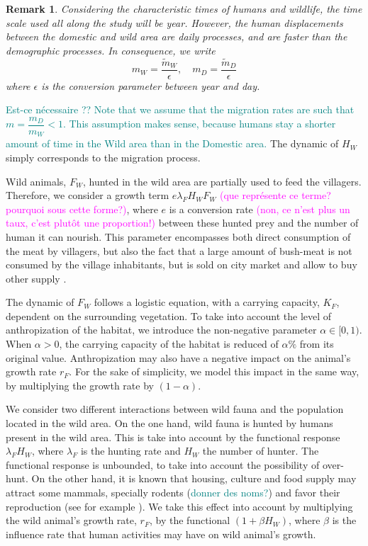 \documentclass{article}
\newcommand{\lfw}{\lambda_{F}}
\newcommand{\lfw}{\lambda_{F}}
\newcommand{\mW}{\tilde{m}_W}
\newcommand{\mD}{\tilde{m}_D}
\newcommand{\marc}[1]{\textcolor{teal}{#1}}
\newcommand{\YD}[1]{\textcolor{magenta}{#1}}
\newtheorem{remark}{Remark}
\begin{document}
\begin{remark} \label{remark:slow-fast}
Considering the characteristic times of humans and wildlife, the time scale used all along the study will be year. However, the human displacements between the domestic and wild area are daily processes, and are faster than the demographic processes. In consequence, we write $$m_W = \dfrac{\mW}{\epsilon}, \quad m_D = \dfrac{\mD}{\epsilon}$$ where $\epsilon$ is the conversion parameter between year and day. 
\end{remark}

\marc{Est-ce nécessaire ??
Note that we assume that the migration rates are such that $m = \dfrac{m_D}{m_W} < 1$. This assumption makes sense, because humans stay a shorter amount of time in the Wild area than in the Domestic area.}
The dynamic of $H_W$ simply corresponds to the migration process. 

Wild animals, $F_W$, hunted in the wild area are partially used to feed the villagers. Therefore, we consider a growth term $e \lfw H_W F_W$ \YD{(que représente ce terme? pourquoi sous cette forme?)}, where $e$ is a conversion rate \YD{(non, ce n'est plus un taux, c'est plutôt une proportion!)} between these hunted prey and the number of human it can nourish. This parameter encompasses both direct consumption of the meat by villagers, but also the fact that a large amount of bush-meat is not consumed by the village inhabitants, but is sold on city market and allow to buy other supply \cite{wilkie_bushmeat_1998}.


The dynamic of $F_W$ follows a logistic equation, with a carrying capacity, $K_F$, dependent on the surrounding vegetation. To take into account the level of anthropization of the habitat, we introduce the non-negative parameter $\alpha \in [0, 1)$. When $\alpha > 0$, the carrying capacity of the habitat is reduced of $\alpha \%$ from its original value. Anthropization may also have a negative impact on the animal's growth rate $r_F$. For the sake of simplicity, we model this impact in the same way, by multiplying the growth rate by $(1-\alpha)$.

We consider two different interactions between wild fauna and the population located in the wild area. On the one hand, wild fauna is hunted by humans present in the wild area. This is take into account by the functional response $\lfw H_W$, where $\lfw$ is the hunting rate and $H_W$ the number of hunter. The functional response is unbounded, to take into account the possibility of over-hunt. On the other hand, it is known that housing, culture and food supply may attract some mammals, specially rodents (\marc{donner des noms?}) and favor their reproduction (see for example \cite{dounias_foraging_2011, dobigny_zoonotic_2022}). We take this effect into account by multiplying the wild animal's growth rate, $r_F$, by the functional $(1 +  \beta H_W)$, where $\beta$ is the influence rate that human activities may have on wild animal's growth.
\end{document}
